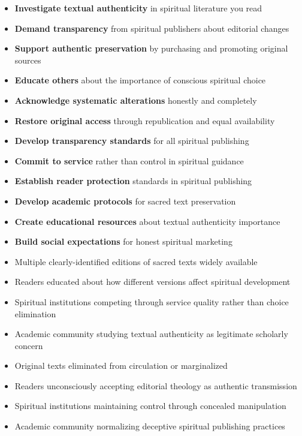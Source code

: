\documentclass[12pt,twoside]{book}
\begin{document}
\begin{itemize}
\item \textbf{\textbf{Investigate textual authenticity}} in spiritual literature you read
\item \textbf{\textbf{Demand transparency}} from spiritual publishers about editorial changes
\item \textbf{\textbf{Support authentic preservation}} by purchasing and promoting original sources
\item \textbf{\textbf{Educate others}} about the importance of conscious spiritual choice

\item \textbf{\textbf{Acknowledge systematic alterations}} honestly and completely
\item \textbf{\textbf{Restore original access}} through republication and equal availability
\item \textbf{\textbf{Develop transparency standards}} for all spiritual publishing
\item \textbf{\textbf{Commit to service}} rather than control in spiritual guidance

\item \textbf{\textbf{Establish reader protection}} standards in spiritual publishing
\item \textbf{\textbf{Develop academic protocols}} for sacred text preservation
\item \textbf{\textbf{Create educational resources}} about textual authenticity importance
\item \textbf{\textbf{Build social expectations}} for honest spiritual marketing
\end{itemize}


\begin{itemize}
\item Multiple clearly-identified editions of sacred texts widely available
\item Readers educated about how different versions affect spiritual development
\item Spiritual institutions competing through service quality rather than choice elimination
\item Academic community studying textual authenticity as legitimate scholarly concern

\item Original texts eliminated from circulation or marginalized
\item Readers unconsciously accepting editorial theology as authentic transmission
\item Spiritual institutions maintaining control through concealed manipulation
\item Academic community normalizing deceptive spiritual publishing practices
\end{itemize}
\end{document}
